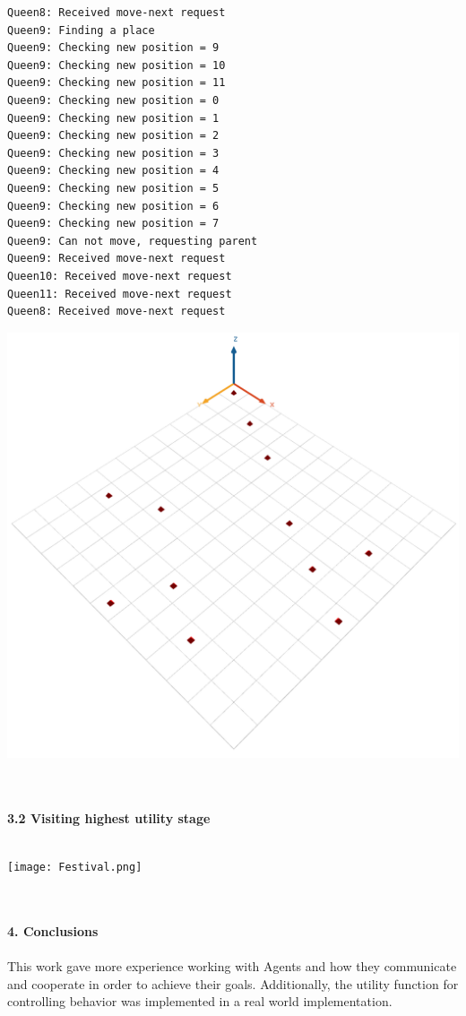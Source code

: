 \documentclass[a4paper,10pt]{article}
\begin{document}
\begin{verbatim}
Queen8: Received move-next request
Queen9: Finding a place
Queen9: Checking new position = 9
Queen9: Checking new position = 10
Queen9: Checking new position = 11
Queen9: Checking new position = 0
Queen9: Checking new position = 1
Queen9: Checking new position = 2
Queen9: Checking new position = 3
Queen9: Checking new position = 4
Queen9: Checking new position = 5
Queen9: Checking new position = 6
Queen9: Checking new position = 7
Queen9: Can not move, requesting parent
Queen9: Received move-next request
Queen10: Received move-next request
Queen11: Received move-next request
Queen8: Received move-next request
\end{verbatim}

\begin{center}{}
\centering\includegraphics[scale=0.3]{Queen.png}\par
\end{center}

\clearpage
\maketitle
\textbf
{\\\\3.2 Visiting highest utility stage\\\\}

\begin{center}{}
\centering\texttt{[image: Festival.png]}\par
\end{center}


\maketitle
\textbf
{\\\\4. Conclusions\\\\}
This work gave more experience working with Agents and how they communicate and cooperate in order to achieve their goals. Additionally, the utility function for controlling behavior was implemented in a real world implementation.
\end{document}
